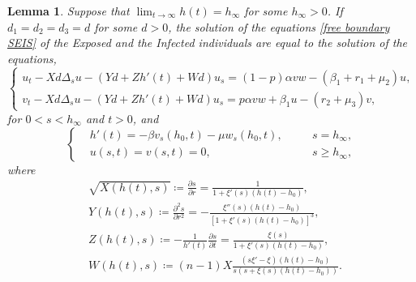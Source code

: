 \documentclass[11pt]{amsart}
\numberwithin{equation}{section}
\theoremstyle{plain}
\newtheorem{lemma}[theorem]{Lemma}
\theoremstyle{definition}
\begin{document}
\begin{lemma} \label{equation changing}
Suppose that $\displaystyle \lim _{t \to \infty}h(t)=h_\infty$ for some $h_\infty >0$. If $d_1=d_2=d_3=d$ for some $d>0$, the solution of the equations \cref{free boundary SEIS} of the Exposed and the Infected individuals are equal to the solution of the equations,
\begin{equation} \label{modified free boundary SEIS4}
	\left \{ \begin{aligned}
		u_t-Xd\Delta_s u-(Yd+Zh'(t)+Wd)u_s=(1-p)\alpha vw-(\beta_1+r_1+\mu_2)u,\\
		v_t-Xd\Delta_s u-(Yd+Zh'(t)+Wd)u_s=p\alpha vw+\beta_1 u-(r_2+\mu_3)v,
	\end{aligned} \right.
\end{equation}
for $0<s<h_\infty$ and $t>0$, and
\begin{equation} \label{modified free boundary SEIS4 cond}
	\left \{ \begin{aligned}
		&h'(t)=-\beta v_s(h_0,t)-\mu w_s(h_0,t), \quad &&s=h_\infty,\\
		&u(s,t)=v(s,t)=0, &&s\geq h_\infty,
	\end{aligned} \right.
\end{equation}
where
\begin{equation*}
	\begin{aligned}
		&\sqrt{X(h(t),s)}\coloneqq \frac{\partial s}{\partial r}=\frac{1}{1+\xi'(s)(h(t)-h_0)},
			\\
		&Y(h(t),s)\coloneqq \frac{\partial^2s}{\partial r^2}=-\frac{\xi''(s)(h(t)-h_0)}{[1+\xi'(s)(h(t)-h_0)]^3},
			\\
		&Z(h(t),s)\coloneqq -\frac{1}{h'(t)}\frac{\partial s}{\partial t}=\frac{\xi(s)}{1+\xi'(s)(h(t)-h_0)},
			\\
		&W(h(t),s)\coloneqq(n-1)X\frac{(s\xi'-\xi)(h(t)-h_0)}{s(s+\xi(s)(h(t)-h_0))}.\,
	\end{aligned}
\end{equation*}
\end{lemma}
\end{document}
